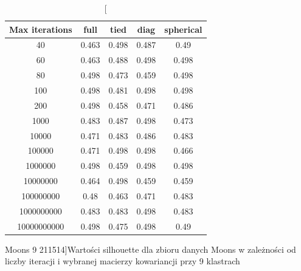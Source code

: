 \documentclass{classrep}
\begin{document}
{{\begin{table}[]
                \begin{minipage}{1\textwidth}
                \centering
                \begin{tabular}{|c|c|c|c|c|}
                \hline
                Max iterations & full & tied & diag & spherical \\ \hline
                40 & 0.463 & 0.498 & 0.487 & 0.49 \\ \hline
                60 & 0.463 & 0.488 & 0.498 & 0.498 \\ \hline
                80 & 0.498 & 0.473 & 0.459 & 0.498 \\ \hline
                100 & 0.498 & 0.481 & 0.498 & 0.498 \\ \hline
                200 & 0.498 & 0.458 & 0.471 & 0.486 \\ \hline
                1000 & 0.483 & 0.487 & 0.498 & 0.473 \\ \hline
                10000 & 0.471 & 0.483 & 0.486 & 0.483 \\ \hline
                100000 & 0.471 & 0.498 & 0.498 & 0.466 \\ \hline
                1000000 & 0.498 & 0.459 & 0.498 & 0.498 \\ \hline
                10000000 & 0.464 & 0.498 & 0.459 & 0.459 \\ \hline
                100000000 & 0.48 & 0.463 & 0.471 & 0.483 \\ \hline
                1000000000 & 0.483 & 0.483 & 0.498 & 0.483 \\ \hline
                10000000000 & 0.498 & 0.475 & 0.498 & 0.49 \\ \hline
                \end{tabular}
                \caption
                [Moons 9 211514]{Wartości silhouette dla zbioru danych Moons w
                zależności od liczby iteracji i wybranej macierzy kowariancji przy 9
                klastrach}
                \label{Moons_9_211514}
                \end{minipage}
                \hfill

            \end{table}
            
}}
\end{document}
